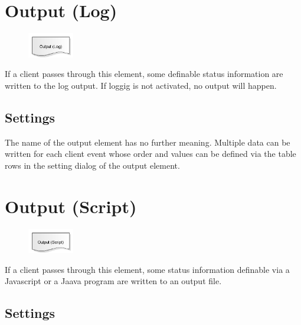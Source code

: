 \section{Output (Log)}
\label{ref:ModelElementOutputLog}

\begin{figure}
\vspace{-22pt}
\includegraphics[width=2cm]{imageModelElementOutputLog.png}
\vspace{-22pt}
\end{figure}

If a client passes through this element, some definable status information are written to the log output.
If loggig is not activated, no output will happen.

\subsection*{Settings}

The name of the output element has no further meaning. Multiple data can be written for each client event whose order and
values can be defined via the table rows in the setting dialog of the output element.


\section{Output (Script)}
\label{ref:ModelElementOutputJS}

\begin{figure}
\vspace{-22pt}
\includegraphics[width=2cm]{imageModelElementOutputJS.png}
\vspace{-22pt}
\end{figure}

If a client passes through this element, some status information definable via
a Javascript or a Jaava program are written to an output file.

\subsection*{Settings}

